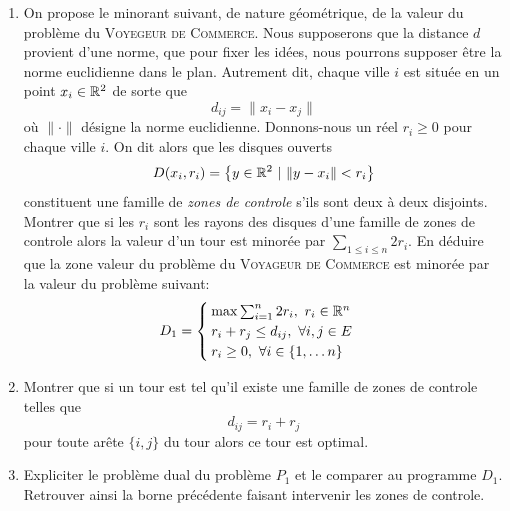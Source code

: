 \begin{td-exo}
\begin{enumerate}
        \item On propose le minorant suivant, de nature géométrique, de la valeur du problème du \textsc{Voyegeur de Commerce}.
        Nous supposerons que la distance \(d\) provient d'une norme, que pour fixer les idées, nous pourrons supposer être la norme euclidienne dans le plan.
        Autrement dit, chaque ville \(i\) est située en un point \(x_i\in \mathbb{R}^2\) de sorte que 
        \begin{equation*}
            d_{ij} = \| x_i - x_j \|
        \end{equation*}
        où \(\|\cdot\|\) désigne la norme euclidienne.
        Donnons-nous un réel \(r_i\geq 0\) pour chaque ville \(i\).
        On dit alors que les disques ouverts
        \begin{equation*}
            D(x_i, r_i) = \left\{
                y \in \mathbb{R}^2\ |\ \| y - x_i\| < r_i
            \right\}
        \end{equation*}
        constituent une famille de \textit{zones de controle} s'ils sont deux à deux disjoints.
        Montrer que si les \(r_i\) sont les rayons des disques d'une famille de zones de controle alors la valeur d'un tour est minorée par \(\sum_{1 \leq i \leq n} 2r_i\).
        En déduire que la zone valeur du problème du \textsc{Voyageur de Commerce} est minorée par la valeur du problème suivant:
        \begin{equation*}
            D_1 = 
            \begin{cases}
                \max \sum_{i=1}^n 2r_i,\ r_i\in\mathbb{R}^n\\
                r_i + r_j \leq d_{ij},\ \forall {i,j}\in E\\
                r_i\geq 0,\ \forall i \in \{1,\ldots n\}
            \end{cases}
        \end{equation*}

        \item Montrer que si un tour est tel qu'il existe une famille de zones de controle telles que 
        \begin{equation*}
            d_{ij} = r_i + r_j
        \end{equation*}
        pour toute arête \(\{i,j\}\) du tour alors ce tour est optimal.

        \item Expliciter le problème dual du problème \(P_1\) et le comparer au programme \(D_1\).
        Retrouver ainsi la borne précédente faisant intervenir les zones de controle.


\end{enumerate}
\end{td-exo}
